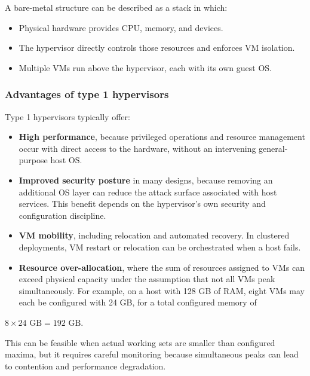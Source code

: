 A bare-metal structure can be described as a stack in which:

\begin{itemize}
\item Physical hardware provides CPU, memory, and devices.
\item The hypervisor directly controls those resources and enforces VM isolation.
\item Multiple VMs run above the hypervisor, each with its own guest OS.
\end{itemize}

\begin{center}
\end{center}

\subsubsection*{Advantages of type 1 hypervisors}

Type 1 hypervisors typically offer:

\begin{itemize}
\item \textbf{High performance}, because privileged operations and resource management occur with direct access to the hardware, without an intervening general-purpose host OS.
\item \textbf{Improved security posture} in many designs, because removing an additional OS layer can reduce the attack surface associated with host services. This benefit depends on the hypervisor's own security and configuration discipline.
\item \textbf{VM mobility}, including relocation and automated recovery. In clustered deployments, VM restart or relocation can be orchestrated when a host fails.
\item \textbf{Resource over-allocation}, where the sum of resources assigned to VMs can exceed physical capacity under the assumption that not all VMs peak simultaneously. For example, on a host with 128 GB of RAM, eight VMs may each be configured with 24 GB, for a total configured memory of
\end{itemize}

$8 \times 24\text{ GB} = 192\text{ GB}$.

This can be feasible when actual working sets are smaller than configured maxima, but it requires careful monitoring because simultaneous peaks can lead to contention and performance degradation.

